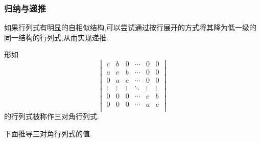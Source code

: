 \documentclass{ctexart}
\begin{document}
\subsubsection{归纳与递推}
\begin{hint}
    如果行列式有明显的自相似结构,可以尝试通过按行展开的方式将其降为低一级的同一结构的行列式,从而实现递推.
\end{hint}
\begin{theorem}[三对角行列式]
    形如
    \[\begin{vmatrix}
        c&b&0&\cdots&0&0\\
        a&c&b&\cdots&0&0\\
        0&a&c&\cdots&0&0\\
        \vdots&\vdots&\vdots&\ddots&\vdots&\vdots\\
        0&0&0&\cdots&c&b\\
        0&0&0&\cdots&a&c\\
    \end{vmatrix}\]
    的行列式被称作三对角行列式.
\end{theorem}
下面推导三对角行列式的值.\\
\end{document}
